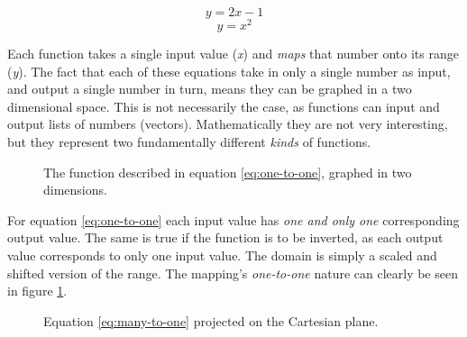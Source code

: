 	\begin{equation} y = 2x - 1 \label{eq:one-to-one} \end{equation} 
	\begin{equation} y = x^2  \label{eq:many-to-one}  \end{equation}

	Each function takes a single input value (\emph{x}) and \emph{maps} that number onto its range (\emph{y}). 
	The fact that each of these equations take in only a single number as input, and output a single number in turn, means they can be graphed in a two dimensional space. This is not necessarily the case, as functions can input and output lists of numbers (vectors). Mathematically they are not very interesting, but they represent two fundamentally different \emph{kinds} of functions.

	\begin{figure}[h]
		\centering
	\caption{The function described in equation \ref{eq:one-to-one}, graphed in two dimensions.}
	\label{fig:one-to-one_graph}
	\end{figure}


	For equation \ref{eq:one-to-one} each input value has \emph{one and only one} corresponding output value. The same is true if the function is to be inverted, as each output value corresponds to only one input value. The domain is simply a scaled and shifted version of the range. The mapping's \emph{one-to-one} nature can clearly be seen in figure \ref{fig:one-to-one_graph}.

	\begin{figure}[h]
		\centering
	\caption{Equation \ref{eq:many-to-one} projected on the Cartesian plane.}
	\label{fig:many-to-one_graph}
	\end{figure}


